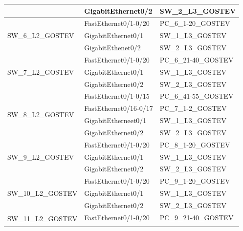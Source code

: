 \documentclass[14pt, a4paper]{extarticle}
\numberwithin{equation}{section}
\begin{document}
\begin{table}[H]
\begin{tabular}{|l|l|l|}
                                    & GigabitEthernet0/2       & SW\_2\_L3\_GOSTEV             \\ \hline
\multirow{3}{*}{SW\_6\_L2\_GOSTEV}  & FastEthernet0/1-0/20     & PC\_6\_1-20\_GOSTEV           \\ \cline{2-3} 
                                    & GigabitEthernet0/1       & SW\_1\_L3\_GOSTEV             \\ \cline{2-3} 
                                    & GigabitEthenet0/2        & SW\_2\_L3\_GOSTEV             \\ \hline
\multirow{3}{*}{SW\_7\_L2\_GOSTEV}  & FastEthernet0/1-0/20     & PC\_6\_21-40\_GOSTEV          \\ \cline{2-3} 
                                    & GigabitEthernet0/1       & SW\_1\_L3\_GOSTEV             \\ \cline{2-3} 
                                    & GigabitEthernet0/2       & SW\_2\_L3\_GOSTEV             \\ \hline
\multirow{4}{*}{SW\_8\_L2\_GOSTEV}  & FastEthernet0/1-0/15     & PC\_6\_41-55\_GOSTEV          \\ \cline{2-3} 
                                    & FastEthernet0/16-0/17    & PC\_7\_1-2\_GOSTEV            \\ \cline{2-3} 
                                    & GigabitEtherneet0/1      & SW\_1\_L3\_GOSTEV             \\ \cline{2-3} 
                                    & GigabitEthernet0/2       & SW\_2\_L3\_GOSTEV             \\ \hline
\multirow{3}{*}{SW\_9\_L2\_GOSTEV}  & FastEthernet0/1-0/20     & PC\_8\_1-20\_GOSTEV           \\ \cline{2-3} 
                                    & GigabitEthernet0/1       & SW\_1\_L3\_GOSTEV             \\ \cline{2-3} 
                                    & GigabitEthernet0/2       & SW\_2\_L3\_GOSTEV             \\ \hline
\multirow{3}{*}{SW\_10\_L2\_GOSTEV} & FastEthernet0/1-0/20     & PC\_9\_1-20\_GOSTEV           \\ \cline{2-3} 
                                    & GigabitEthernet0/1       & SW\_1\_L3\_GOSTEV             \\ \cline{2-3} 
                                    & GigabitEthernet0/2       & SW\_2\_L3\_GOSTEV             \\ \hline
\multirow{3}{*}{SW\_11\_L2\_GOSTEV} & FastEthernet0/1-0/20     & PC\_9\_21-40\_GOSTEV          \\ \cline{2-3} 

\end{tabular}
\end{table}
\end{document}
